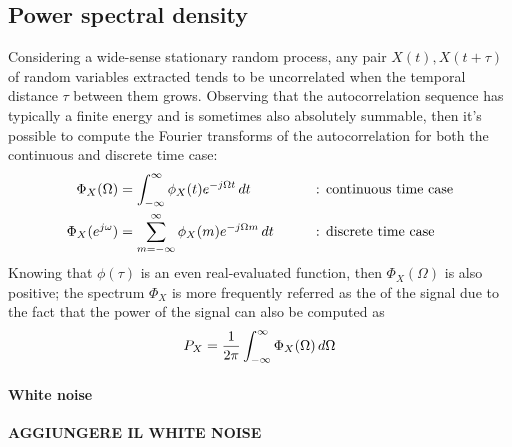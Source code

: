 	\subsection{Power spectral density} \label{sec:prob:psd}
		Considering a wide-sense stationary random process, any pair $X(t), X(t+\tau)$ of random variables extracted tends to be uncorrelated when the temporal distance $\tau$ between them grows. Observing that the autocorrelation sequence has typically a finite energy and is sometimes also absolutely summable, then it's possible to compute the Fourier transforms of the autocorrelation for both the continuous and discrete time case:
		\begin{equation} \label{eq:prob:psd}
		\begin{aligned}
			\Phi_X(\Omega) & = \int_{-\infty}^\infty \phi_X(t) e^{-j\Omega t} \, dt \qquad && \text{: continuous time case} \\
			\Phi_X(e^{j\omega}) & = \sum_{m=-\infty}^\infty \phi_X(m) e^{-j\Omega m} \, dt \qquad && \text{: discrete time case} \\
		\end{aligned}
		\end{equation}
		Knowing that $\phi(\tau)$ is an even real-evaluated function, then $\Phi_X(\Omega)$ is also positive; the spectrum $\Phi_X$ is more frequently referred as the  of the signal due to the fact that the power of the signal can also be computed as
		\begin{equation}
			P_X = \frac 1 {2\pi} \int_{-\infty}^\infty \Phi_X(\Omega)\, d\Omega
		\end{equation}
		
		
		
		\paragraph{White noise} \textbf{AGGIUNGERE IL WHITE NOISE}
		
	
	
	
	